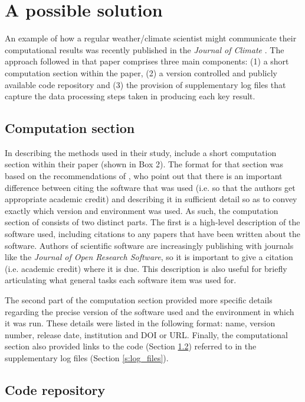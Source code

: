 \section{A possible solution}

An example of how a regular weather/climate scientist might communicate their computational results was recently published in the \textit{Journal of Climate} \citep{Irving2015}. The approach followed in that paper comprises three main components: (1) a short computation section within the paper, (2) a version controlled and publicly available code repository and (3) the provision of supplementary log files that capture the data processing steps taken in producing each key result. 

\subsection{Computation section}

In describing the methods used in their study, \citet{Irving2015} include a short computation section within their paper (shown in Box 2). The format for that section was based on the recommendations of \citet{Jackson2012}, who point out that there is an important difference between citing the software that was used (i.e. so that the authors get appropriate academic credit) and describing it in sufficient detail so as to convey exactly which version and environment was used. As such, the computation section of \citet{Irving2015} consists of two distinct parts. The first is a high-level description of the software used, including citations to any papers that have been written about the software. Authors of scientific software are increasingly publishing with journals like the \textit{Journal of Open Research Software}, so it is important to give a citation (i.e. academic credit) where it is due. This description is also useful for briefly articulating what general tasks each software item was used for.

The second part of the computation section provided more specific details regarding the precise version of the software used and the environment in which it was run. These details were listed in the following format: name, version number, release date, institution and DOI or URL. Finally, the computational section also provided links to the code (Section \ref{s:code_repo}) referred to in the supplementary log files (Section \ref{s:log_files}).  

\subsection{Code repository}\label{s:code_repo}

